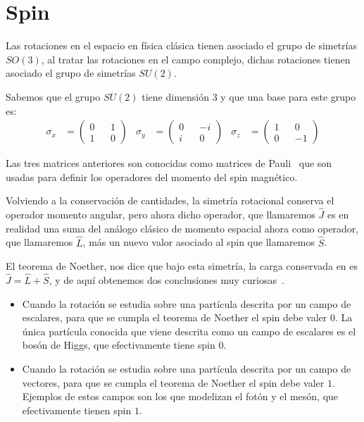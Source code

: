 \section{Spin}\label{sec:spin}
Las rotaciones en el espacio en física clásica tienen asociado el grupo de simetrías $SO(3)$, al tratar las rotaciones en el campo complejo, dichas rotaciones tienen asociado el grupo de simetrías $SU(2)$.

Sabemos que el grupo $SU(2)$ tiene dimensión $3$ y que una base para este grupo es:
\begin{align}
	\sigma_x & = \begin{pmatrix} 0 && 1 \\ 1 && 0 \end{pmatrix} &
	\sigma_y & = \begin{pmatrix} 0 && -i \\ i && 0 \end{pmatrix} &
	\sigma_z & = \begin{pmatrix} 1 && 0 \\ 0 && -1 \end{pmatrix}
\end{align}

Las tres matrices anteriores son conocidas como matrices de Pauli~\autocite[50]{IQC} que son usadas para definir los operadores del momento del spin magnético.

Volviendo a la conservación de cantidades, la simetría rotacional conserva el operador momento angular, pero ahora dicho operador, que llamaremos $\hat{J}$ es en realidad una suma del análogo clásico de momento espacial ahora como operador, que llamaremos $\hat{L}$, más un nuevo valor asociado al spin que llamaremos $\hat{S}$.

El teorema de Noether, nos dice que bajo esta simetría, la carga conservada en es $\hat{J}=\hat{L}+\hat{S}$, y de aquí obtenemos dos conclusiones muy curiosas~\autocite[45]{QMS}.
\begin{itemize}
	\item Cuando la rotación se estudia sobre una partícula descrita por un campo de escalares, para que se cumpla el teorema de Noether el spin debe valer $0$. La única partícula conocida que viene descrita como un campo de escalares es el bosón de Higgs, que efectivamente tiene spin $0$.
	\item Cuando la rotación se estudia sobre una partícula descrita por un campo de vectores, para que se cumpla el teorema de Noether el spin debe valer $1$. Ejemplos de estos campos son los que modelizan el fotón y el mesón, que efectivamente tienen spin $1$.
\end{itemize}

